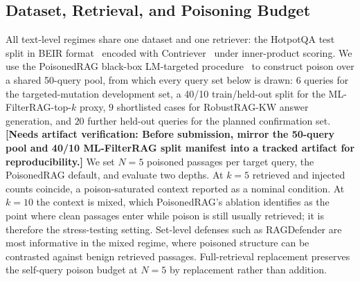 \documentclass[conference]{IEEEtran}
\newcommand{\VERIFY}[1]{\textbf{[Needs artifact verification: #1]}}
\newcommand{\NdevQ}{6}           %
\newcommand{\NconfQ}{20}         %
\newcommand{\NrrkwCases}{9}      %
\newcommand{\Npoison}{5}         %
\newcommand{\Ktop}{10}           %
\begin{document}
\subsection{Dataset, Retrieval, and Poisoning Budget}
\label{subsec:budget}
All text-level regimes share one dataset and one retriever: the HotpotQA test
split in BEIR format~\cite{yang2018hotpotqa} encoded with
Contriever~\cite{izacard2022contriever} under inner-product scoring. We use the
PoisonedRAG black-box LM-targeted procedure~\cite{zou2025poisonedrag} to
construct poison over a shared 50-query pool, from which every query set below is
drawn: $\NdevQ$ queries for the targeted-mutation development set, a 40/10
train/held-out split for the ML-FilterRAG-top-$k$ proxy, $\NrrkwCases$
shortlisted cases for RobustRAG-KW answer generation, and $\NconfQ$ further
held-out queries for the planned confirmation set.
\VERIFY{Before submission, mirror the 50-query pool and 40/10 ML-FilterRAG split
manifest into a tracked artifact for reproducibility.} We set $N=\Npoison$
poisoned passages per target query, the PoisonedRAG default, and evaluate two
depths. At $k=5$ retrieved and injected counts coincide, a poison-saturated
context reported as a nominal condition. At $k=\Ktop$ the context is mixed, which
PoisonedRAG's ablation identifies as the point where clean passages enter while
poison is still usually retrieved; it is therefore the stress-testing setting. Set-level defenses such as RAGDefender are most informative in the mixed
regime, where poisoned structure can be contrasted against benign retrieved
passages. Full-retrieval replacement preserves the self-query poison budget at
$N=\Npoison$ by replacement rather than addition.
\end{document}
